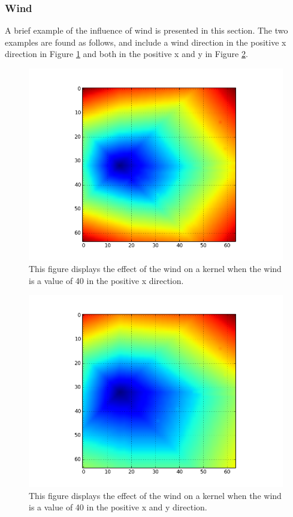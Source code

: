 \subsubsection{Wind}\label{sec:wind}
A brief example of the influence of wind is presented in this section. The two examples are found as follows, and include a wind direction in the positive x direction in Figure \ref{fig:wind} and both in the positive x and y in Figure \ref{fig:wind_both}. 
\begin{figure}[H]
\centering
  \includegraphics[height=.4\textheight]{figures/results/40_wind.png}
  \caption{This figure displays the effect of the wind on a kernel when the wind is a value of 40 in the positive x direction.}
  \label{fig:wind}
\end{figure}  
\begin{figure}[H]
\centering
  \includegraphics[height=.4\textheight]{figures/results/40_40_wind.png}
  \caption{This figure displays the effect of the wind on a kernel when the wind is a value of 40 in the positive x and y direction.}
  \label{fig:wind_both}
\end{figure} 

